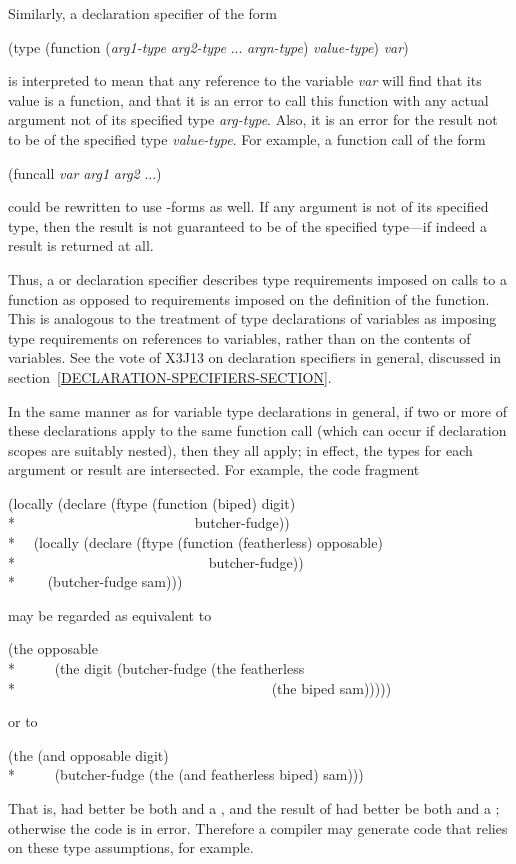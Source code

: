 \begin{flushdesc}
\begin{new}
Similarly, a declaration specifier of the form
\begin{lisp}
(type (function (\emph{arg1-type} \emph{arg2-type} ... \emph{argn-type}) \emph{value-type}) \emph{var})
\end{lisp}
is interpreted to mean that any reference to the variable \emph{var}
will find that its value is a function, and that
it is an error to call this function with any actual argument not of
its specified type \emph{arg-type}.
Also, it is an error for the result not to be of the specified
type \emph{value-type}.
For example, a function call of the form
\begin{lisp}
(funcall \emph{var} \emph{arg1} \emph{arg2} ...)
\end{lisp}
could be rewritten to use -forms as well.
If any argument is not of
its specified type, then the result is not guaranteed to be of the
specified type---if indeed a result is returned at all.

Thus, a  or  declaration specifier describes type
requirements imposed on calls to a function
as opposed to requirements imposed on the definition of the function.
This is analogous to the treatment of type declarations of variables
as imposing type requirements on references to variables, rather than
on the contents of variables.  See the vote of X3J13 on 
declaration specifiers in general, discussed
in section~\ref{DECLARATION-SPECIFIERS-SECTION}.

In the same manner as for variable type declarations in general,
if two or more
of these declarations apply to the same function call (which can
occur if declaration scopes are suitably nested), then they all apply;
in effect, the types for each argument or result are intersected.
For example, the code fragment
\begin{lisp}
(locally (declare (ftype (function (biped) digit) \\*
~~~~~~~~~~~~~~~~~~~~~~~~~butcher-fudge)) \\*
~~(locally (declare (ftype (function (featherless) opposable) \\*
~~~~~~~~~~~~~~~~~~~~~~~~~~~butcher-fudge)) \\*
~~~~(butcher-fudge sam)))
\end{lisp}
may be regarded as equivalent to
\begin{lisp}
(the opposable \\*
~~~~~(the digit (butcher-fudge (the featherless \\*
~~~~~~~~~~~~~~~~~~~~~~~~~~~~~~~~~~~~(the biped sam)))))
\end{lisp}
or to
\begin{lisp}
(the (and opposable digit) \\*
~~~~~(butcher-fudge (the (and featherless biped) sam)))
\end{lisp}
That is,  had better be both  and a ,
and the result of  had better be both
 and a ; otherwise the code is in error.
Therefore a compiler may generate code that relies on these type assumptions,
for example.
\end{new}



\end{flushdesc}
